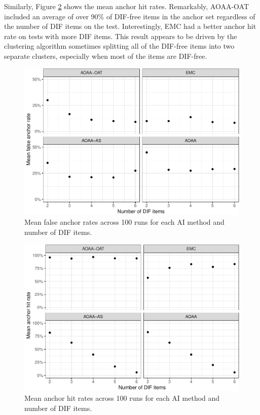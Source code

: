 \documentclass[
  11pt,
]{article}
\begin{document}
Similarly, Figure \ref{fig:anchorhit} shows the mean anchor hit rates. Remarkably, AOAA-OAT included an average of over \(90\%\) of DIF-free items in the anchor set regardless of the number of DIF items on the test. Interestingly, EMC had a better anchor hit rate on tests with more DIF items. This result appears to be driven by the clustering algorithm sometimes splitting all of the DIF-free items into two separate clusters, especially when most of the items are DIF-free.

\begin{figure}[H]

{\centering \includegraphics[width=0.7\linewidth]{paper_files/figure-latex/anchorfalse-1} 

}

\caption{Mean false anchor rates across 100 runs for each AI method and number of DIF items.}\label{fig:anchorfalse}
\end{figure}

\begin{figure}[H]

{\centering \includegraphics[width=0.7\linewidth]{paper_files/figure-latex/anchorhit-1} 

}

\caption{Mean anchor hit rates across 100 runs for each AI method and number of DIF items.}\label{fig:anchorhit}
\end{figure}
\end{document}
